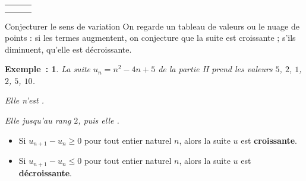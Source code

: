 \documentclass[12pt]{article}
\theoremstyle{break}
\newtheorem*{example}{Exemple~:}
\theoremstyle{inline}
\begin{document}
\begin{center}
  \begin{tabular}{C{0.31\linewidth}C{0.31\linewidth}C{0.31\linewidth}}
     &  &  \\[0.3em]
    &
    &
  \end{tabular}
\end{center}

\begin{method}{Conjecturer le sens de variation}{}
  On regarde un tableau de valeurs ou le nuage de points : si les termes augmentent, on conjecture que la suite est croissante ; s'ils diminuent, qu'elle est décroissante.
\end{method}

\begin{example}
  La suite $u_n = n^2 - 4n + 5$ de la partie II prend les valeurs $5$, $2$, $1$, $2$, $5$, $10$.

  Elle n'est .

  Elle  jusqu'au rang $2$, puis elle .
\end{example}

\begin{proposition}{}{}
  \begin{multihide}
    \begin{itemize}
      \item Si $u_{n+1} - u_n \geqslant 0$ pour tout entier naturel $n$, alors la suite $u$ est \textbf{croissante}.
      \item Si $u_{n+1} - u_n \leqslant 0$ pour tout entier naturel $n$, alors la suite $u$ est \textbf{décroissante}.
    \end{itemize}
  \end{multihide}
\end{proposition}
\end{document}

